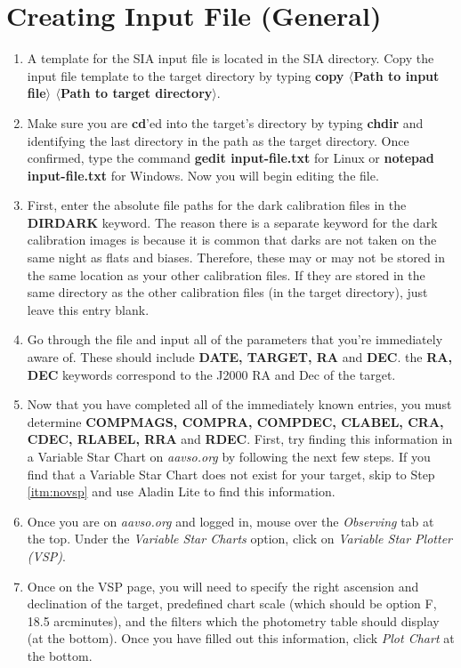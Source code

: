 \documentclass[11pt]{report}
\begin{document}
\section{Creating Input File (General)}
\label{sect:inputfile}
\begin{enumerate}
\item A template for the SIA input file is located in the SIA directory. Copy the input file template to the target directory by typing {\bf copy $\langle$Path to input file$\rangle$ $\langle$Path to target directory$\rangle$}.
\item Make sure you are {\bf cd}'ed into the target's directory by typing \textbf{chdir} and identifying the last directory in the path as the target directory. Once confirmed, type the command {\bf gedit input-file.txt} for Linux or {\bf notepad input-file.txt} for Windows. Now you will begin editing the file.
\item First, enter the absolute file paths for the dark calibration files in the {\bf DIRDARK} keyword. The reason there is a separate keyword for the dark calibration images is because it is common that darks are not taken on the same night as flats and biases. Therefore, these may or may not be stored in the same location as your other calibration files. If they are stored in the same directory as the other calibration files (in the target directory), just leave this entry blank.
\item Go through the file and input all of the parameters that you're immediately aware of. These should include {\bf DATE, TARGET, RA} and {\bf DEC}. the {\bf RA, DEC} keywords correspond to the J2000 RA and Dec of the target.
\item Now that you have completed all of the immediately known entries, you must determine {\bf COMPMAGS, COMPRA, COMPDEC, CLABEL, CRA, CDEC, RLABEL, RRA} and {\bf RDEC}. First, try finding this information in a Variable Star Chart on \emph{aavso.org} by following the next few steps. If you find that a Variable Star Chart does not exist for your target, skip to Step \ref{itm:novsp} and use Aladin Lite to find this information.
\item Once you are on \emph{aavso.org} and logged in, mouse over the \emph{Observing} tab at the top. Under the \emph{Variable Star Charts} option, click on \emph{Variable Star Plotter (VSP)}. 
\item Once on the VSP page, you will need to specify the right ascension and declination of the target, predefined chart scale (which should be option F, 18.5 arcminutes), and the filters which the photometry table should display (at the bottom). Once you have filled out this information, click \emph{Plot Chart} at the bottom.

\end{enumerate}
\end{document}
